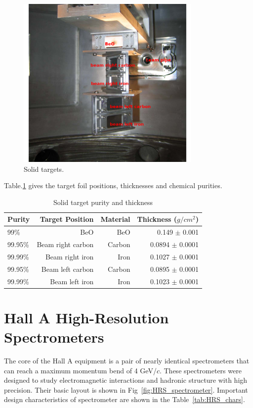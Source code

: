 \begin{figure}[tb!]
\centering
\includegraphics[width=0.8\textwidth]{figs/carbon_iron_target_edit.png}
\caption[Solid targets ]{Solid targets. }\label{fig:carbon_iron}
\end{figure}

Table.\ref{tab:purity_thickness} gives the target foil positions, thicknesses and chemical purities.

\begin{table}[tb!]
\centering
\begin{tabular}{|l|r|r|r|}
\hline
Purity  & Target Position   & Material & Thickness ($g/cm^2$) \\ \hline
99\%    & BeO               & BeO      & 0.149 $\pm$ 0.001    \\ \hline
99.95\% & Beam right carbon & Carbon   & 0.0894 $\pm$ 0.0001  \\ \hline
99.99\% & Beam right iron   & Iron     & 0.1027 $\pm$ 0.0001  \\ \hline
99.95\% & Beam left carbon  & Carbon   & 0.0895 $\pm$ 0.0001  \\ \hline
99.99\% & Beam left iron    & Iron     & 0.1023 $\pm$ 0.0001  \\ \hline
\end{tabular}
\caption[Solid target purity and thickness]{Solid target purity and thickness}\label{tab:purity_thickness}
\end{table}


\section{Hall A High-Resolution Spectrometers}
The core of the Hall A equipment is a pair of nearly identical spectrometers that can reach a maximum momentum bend of
4 GeV/$c$. These spectrometers were
designed to study electromagnetic interactions and hadronic structure with high precision.
Their basic layout is shown in Fig~\ref{fig:HRS_spectrometer}.
Important design characteristics of spectrometer are shown in the Table~\ref{tab:HRS_chars}.



